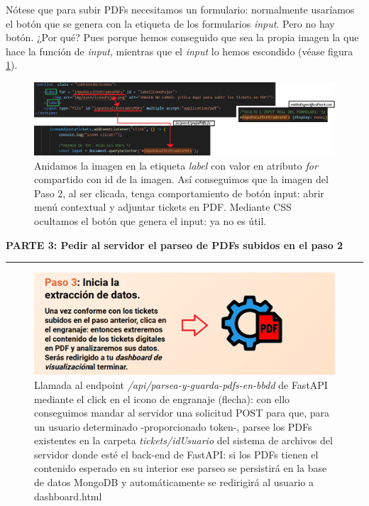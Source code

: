 \documentclass[a4paper,12pt]{report}
\begin{document}
	Nótese que para subir PDFs necesitamos un formulario: normalmente usaríamos el botón que se genera con la etiqueta de los formularios \textit{input}. Pero no hay botón. ¿Por qué? Pues porque hemos conseguido que sea la propia imagen la que hace la función de \textit{input}, mientras que el \textit{input} lo hemos escondido (véase figura \ref{fig:pujarTicketsAuxiliarLabelHTML}).
	
	
	\begin{figure}[H]
		\centering
		\caption{Anidamos la imagen en la etiqueta \textit{label} con valor en atributo \textit{for} compartido con id de la imagen. Así conseguimos que la imagen del Paso 2, al ser clicada, tenga comportamiento de botón input: abrir menú contextual y adjuntar tickets en PDF. Mediante CSS ocultamos el botón que genera el input: ya no es útil.}
		\includegraphics[width=1\linewidth]{img/pujarTicketsAuxiliarLabelHTML}

		\label{fig:pujarTicketsAuxiliarLabelHTML}
	\end{figure}
	

			
	\noindent \textbf{PARTE 3: Pedir al servidor el parseo de PDFs subidos en el paso 2}
	\hrule
	\vspace{.5em}
	
	
	
	\begin{figure}[H]
		\centering
		\caption{Llamada al endpoint \textit{/api/parsea-y-guarda-pdfs-en-bbdd} de FastAPI mediante el click en el icono de engranaje (flecha): con ello conseguimos mandar al servidor una solicitud POST para que, para un usuario determinado -proporcionado token-, parsee los PDFs existentes en la carpeta \textit{tickets/idUsuario} del sistema de archivos del servidor donde esté el back-end de FastAPI: si los PDFs tienen el contenido esperado en su interior ese parseo se persistirá en la base de datos MongoDB y automáticamente se redirigirá al usuario a dashboard.html}
		\includegraphics[width=1\linewidth]{img/part3pas4engranatge}

		\label{fig:part3pas4engranatge}
	\end{figure}
	
\end{document}
